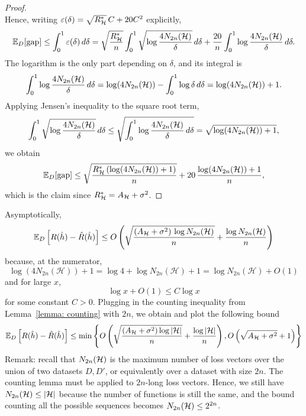 \documentclass[reqno]{amsart}
\begin{document}
\begin{corollary}
\begin{proof}
\[\]
Hence, writing $\varepsilon(\delta) = \sqrt{R^*_{\mathcal{H}}}\,C + 20C^2$ explicitly,
\[
\mathbb{E}_D[\text{gap}] \le \int_0^1 \varepsilon(\delta)\,d\delta = \sqrt{\frac{R^*_{\mathcal{H}}}{n}}\int_0^1 \sqrt{\log\frac{4N_{2n}(\mathcal{H})}{\delta}}\,d\delta + \frac{20}{n}\int_0^1 \log\frac{4N_{2n}(\mathcal{H})}{\delta}\,d\delta.
\]
The logarithm is the only part depending on $\delta$, and its integral is
\[
\int_0^1 \log\frac{4N_{2n}(\mathcal{H})}{\delta}\,d\delta = \log(4N_{2n}(\mathcal{H})) - \int_0^1 \log\delta\,d\delta = \log(4N_{2n}(\mathcal{H})) + 1.
\]
Applying Jensen's inequality to the square root term,
\[
\int_0^1 \sqrt{\log\frac{4N_{2n}(\mathcal{H})}{\delta}}\,d\delta \le \sqrt{\int_0^1 \log\frac{4N_{2n}(\mathcal{H})}{\delta}\,d\delta} = \sqrt{\log(4N_{2n}(\mathcal{H})) + 1},
\]
we obtain
\[
\mathbb{E}_D[\text{gap}] \le \sqrt{\frac{R^*_{\mathcal{H}}\left(\log(4N_{2n}(\mathcal{H})) + 1\right)}{n}} + 20\,\frac{\log(4N_{2n}(\mathcal{H})) + 1}{n},
\]
which is the claim since $R^*_{\mathcal{H}} = A_{\mathcal{H}} + \sigma^2$.

\end{proof}
\end{corollary}

Asymptotically,
\[
\mathbb{E}_D\left[R(\hat h)-\hat R(\hat h)\right] \le O\left(
\sqrt{\frac{(A_{\mathcal H}+\sigma^2)\,\log N_{2n}(\mathcal H)}{n}} + \frac{\log N_{2n}(\mathcal H)}{n} \right)
\]
because, at the numerator,
\[
\log (4 N_{2n}(\mathcal H)) + 1 = \log 4 + \log N_{2n}(\mathcal H) + 1 = \log N_{2n}(\mathcal H) + O(1)
\]
and for large $x$, 
\[
\log x + O(1) \le C \log x
\] 
for some constant $C>0$. Plugging in the counting inequality from Lemma~\ref{lemma: counting} with $2n$, we obtain and plot the following bound
\[
\mathbb{E}_D\left[R(\hat h)-\hat R(\hat h)\right] \le \min\left\{ O\left(
\sqrt{\frac{(A_{\mathcal H}+\sigma^2)\log \vert\mathcal{H}\vert}{n}} + \frac{\log\vert\mathcal{H}\vert}{n} \right), O\left(
\sqrt{A_{\mathcal H}+\sigma^2}+1  \right)\right\}
\]
Remark: recall that $N_{2n}(\mathcal{H})$ is the maximum number of loss vectors over the union of two datasets $D, D'$, or equivalently over a dataset with size $2n$. The counting lemma must be applied to $2n$-long loss vectors. Hence, we still have $N_{2n}(\mathcal{H}) \le \vert \mathcal{H}\vert$ because the number of functions is still the same, and the bound counting all the possible sequences becomes $N_{2n}(\mathcal{H}) \le 2^{2n}$. 
\end{document}
